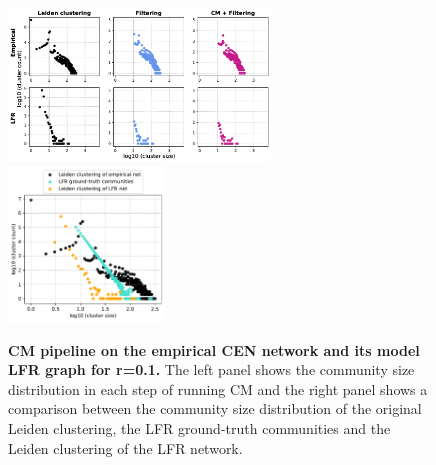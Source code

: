 \documentclass[a4paper]{article}   	%
\begin{document}
\begin{figure}[h!]
\centering
\includegraphics[width=0.62\textwidth]{figs/cen_cm_steps_lfr1.pdf}
\includegraphics[width=0.37\textwidth]{figs/cen_1_cm_size.pdf}
\caption[CM pipeline on the empirical CEN network and its model LFR graph for r=0.1]{\textbf{CM pipeline on the empirical CEN network and its model LFR graph for r=0.1.} The left panel shows the community size distribution in each step of running CM and the right panel shows a comparison between the community size distribution of the original Leiden clustering, the LFR ground-truth communities and the Leiden clustering of the LFR network.}
\label{fig:cen-cm-lfr-1}
\end{figure}
\end{document}
